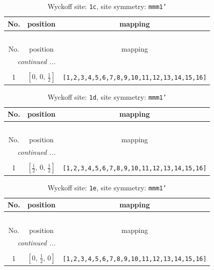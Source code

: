 \documentclass[fleqn,8pt]{jsarticle}
\begin{document}
\begin{longtable}{ccc}
\caption{Wyckoff site: {\tt 1c}, site symmetry: {\tt mmm1'}}
 \\
 \hline \hline
No. & position & mapping \\ \hline \endfirsthead

\multicolumn{2}{l}{\tablename\ \thetable{}} \\
 \hline \hline
No. & position & mapping \\ \hline \endhead

 \hline \hline
\multicolumn{2}{r}{\footnotesize\it continued ...} \\ \endfoot

 \hline \hline
\multicolumn{2}{r}{} \\ \endlastfoot

1 & $\left[ 0,\, 0,\, \frac{1}{2} \right]$ & {\tt [1,2,3,4,5,6,7,8,9,10,11,12,13,14,15,16]} \\
\end{longtable}
\renewcommand{\arraystretch}{1.2}
\begin{longtable}{ccc}
\caption{Wyckoff site: {\tt 1d}, site symmetry: {\tt mmm1'}}
 \\
 \hline \hline
No. & position & mapping \\ \hline \endfirsthead

\multicolumn{2}{l}{\tablename\ \thetable{}} \\
 \hline \hline
No. & position & mapping \\ \hline \endhead

 \hline \hline
\multicolumn{2}{r}{\footnotesize\it continued ...} \\ \endfoot

 \hline \hline
\multicolumn{2}{r}{} \\ \endlastfoot

1 & $\left[ \frac{1}{2},\, 0,\, \frac{1}{2} \right]$ & {\tt [1,2,3,4,5,6,7,8,9,10,11,12,13,14,15,16]} \\
\end{longtable}
\renewcommand{\arraystretch}{1.2}
\begin{longtable}{ccc}
\caption{Wyckoff site: {\tt 1e}, site symmetry: {\tt mmm1'}}
 \\
 \hline \hline
No. & position & mapping \\ \hline \endfirsthead

\multicolumn{2}{l}{\tablename\ \thetable{}} \\
 \hline \hline
No. & position & mapping \\ \hline \endhead

 \hline \hline
\multicolumn{2}{r}{\footnotesize\it continued ...} \\ \endfoot

 \hline \hline
\multicolumn{2}{r}{} \\ \endlastfoot

1 & $\left[ 0,\, \frac{1}{2},\, 0 \right]$ & {\tt [1,2,3,4,5,6,7,8,9,10,11,12,13,14,15,16]} \\
\end{longtable}
\end{document}
